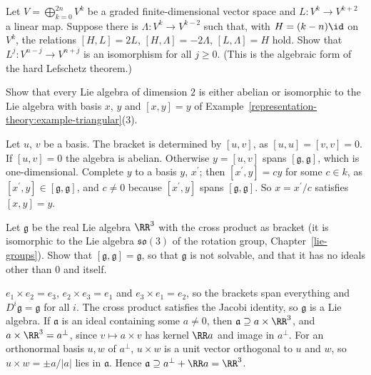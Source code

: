 \begin{exercise}\label{representation-theory:exercise-sl2-lefschetz}
Let $V = \bigoplus_{k=0}^{2n} V^k$ be a graded finite-dimensional vector space and $L \colon V^k \to V^{k+2}$ a linear map. Suppose there is
$\Lambda \colon V^k \to V^{k-2}$ such that, with $H = (k - n)\id$ on $V^k$, the relations $[H, L] = 2L$, $[H, \Lambda] = -2\Lambda$,
$[L, \Lambda] = H$ hold. Show that $L^j \colon V^{n-j} \to V^{n+j}$ is an isomorphism for all $j \geq 0$. (This is the algebraic form
of the hard Lefschetz theorem.)
\end{exercise}

\begin{exercise}\label{representation-theory:exercise-two-dimensional}
Show that every Lie algebra of dimension $2$ is either abelian or isomorphic to the Lie algebra with basis $x$, $y$ and $[x, y] = y$ of
Example~\ref{representation-theory:example-triangular}(3).
\end{exercise}

\begin{solution}
Let $u$, $v$ be a basis. The bracket is determined by $[u, v]$, as $[u, u] = [v, v] = 0$. If $[u, v] = 0$ the algebra is abelian. Otherwise $y = [u, v]$ spans
$[\mathfrak{g}, \mathfrak{g}]$, which is one-dimensional. Complete $y$ to a basis $y$, $x^{\prime}$; then $[x^{\prime}, y] = cy$ for some $c \in k$, as $[x^{\prime}, y] \in [\mathfrak{g}, \mathfrak{g}]$,
and $c \neq 0$ because $[x^{\prime}, y]$ spans $[\mathfrak{g}, \mathfrak{g}]$. So $x = x^{\prime}/c$ satisfies $[x, y] = y$.
\end{solution}

\begin{exercise}\label{representation-theory:exercise-so3-not-solvable}
Let $\mathfrak{g}$ be the real Lie algebra $\RR^3$ with the cross product as bracket (it is isomorphic to the Lie algebra $\mathfrak{so}(3)$ of the rotation group,
Chapter~\ref{lie-groups}). Show that $[\mathfrak{g}, \mathfrak{g}] = \mathfrak{g}$, so that $\mathfrak{g}$ is not solvable, and that it has no ideals other than $0$ and itself.
\end{exercise}

\begin{solution}
$e_1 \times e_2 = e_3$, $e_2 \times e_3 = e_1$ and $e_3 \times e_1 = e_2$, so the brackets span everything and $D^i\mathfrak{g} = \mathfrak{g}$ for all $i$. The cross product satisfies the Jacobi identity, so $\mathfrak{g}$ is a Lie algebra. If $\mathfrak{a}$ is an
ideal containing some $a \neq 0$, then $\mathfrak{a} \supseteq a \times \RR^3$, and $a \times \RR^3 = a^\perp$, since $v \mapsto a \times v$ has kernel $\RR a$ and image in
$a^\perp$. For an orthonormal basis $u, w$ of $a^\perp$, $u \times w$ is a unit vector orthogonal to $u$ and $w$, so $u \times w = \pm a/|a|$ lies in $\mathfrak{a}$. Hence
$\mathfrak{a} \supseteq a^\perp + \RR a = \RR^3$.
\end{solution}

